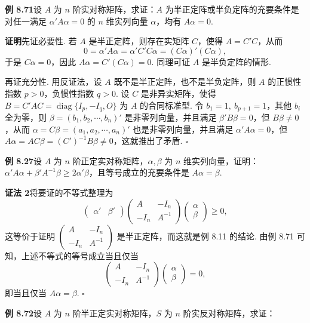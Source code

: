 \documentclass[UTF8, 12pt, fontset=fandol, oneside]{ctexart}
\begin{document}
\noindent\textbf{例 8.71}\quad 设 $A$ 为 $n$ 阶实对称矩阵，求证：$A$ 为半正定阵或半负定阵的充要条件是对任一满足 $\alpha'A\alpha=0$ 的 $n$ 维实列向量 $\alpha$，均有 $A\alpha=0$.

\noindent\textbf{证明}\quad 先证必要性. 若 $A$ 是半正定阵，则存在实矩阵 $C$，使得 $A=C'C$，从而
\[
0=\alpha'A\alpha=\alpha'C'C\alpha=(C\alpha)'(C\alpha),
\]
于是 $C\alpha=0$，因此 $A\alpha=C'(C\alpha)=0$. 同理可证 $A$ 是半负定阵的情形.

再证充分性. 用反证法，设 $A$ 既不是半正定阵，也不是半负定阵，则 $A$ 的正惯性指数 $p>0$，负惯性指数 $q>0$. 设 $C$ 是非异实矩阵，使得 $B=C'AC=\operatorname{diag}\{I_p,-I_q,O\}$ 为 $A$ 的合同标准型. 令 $b_1=1,\ b_{p+1}=1$，其他 $b_i$ 全为零，则 $\beta=(b_1,b_2,\cdots,b_n)'$ 是非零列向量，并且满足 $\beta'B\beta=0$，但 $B\beta\ne 0$，从而 $\alpha=C\beta=(a_1,a_2,\cdots,a_n)'$ 也是非零列向量，并且满足 $\alpha'A\alpha=0$，但 $A\alpha=AC\beta=(C')^{-1}B\beta\ne 0$，这就推出了矛盾. $\ensuremath{\square}$

\noindent\textbf{例 8.27}\quad 设 $A$ 为 $n$ 阶正定实对称矩阵，$\alpha,\beta$ 为 $n$ 维实列向量，证明：$\alpha'A\alpha+\beta'A^{-1}\beta\ge 2\alpha'\beta$，且等号成立的充要条件是 $A\alpha=\beta$.

\noindent\textbf{证法 2}\quad 将要证的不等式整理为
\[
\left(\begin{array}{cc}\alpha'&\beta'\end{array}\right)
\left(\begin{array}{cc}
A & -I_n\\
-I_n & A^{-1}
\end{array}\right)
\left(\begin{array}{c}
\alpha\\
\beta
\end{array}\right)\ge 0,
\]
这等价于证明 $\left(\begin{array}{cc}A&-I_n\\ -I_n&A^{-1}\end{array}\right)$ 是半正定阵，而这就是例 8.11 的结论. 由例 8.71 可知，上述不等式的等号成立当且仅当
\[
\left(\begin{array}{cc}
A & -I_n\\
-I_n & A^{-1}
\end{array}\right)
\left(\begin{array}{c}
\alpha\\
\beta
\end{array}\right)=0,
\]
即当且仅当 $A\alpha=\beta$. $\ensuremath{\square}$

\noindent\textbf{例 8.72}\quad 设 $A$ 为 $n$ 阶半正定实对称矩阵，$S$ 为 $n$ 阶实反对称矩阵，求证：
\end{document}

